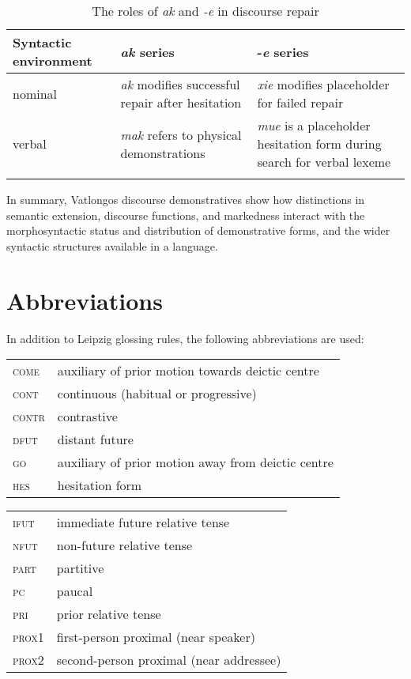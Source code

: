 \documentclass[output=paper,colorlinks,citecolor=brown]{langscibook}
\begin{document}
\begin{table}
\caption{The roles of \textit{ak} and \textit{-e} in discourse repair}
\label{tab:ridge:11}
\begin{tabularx}{\textwidth}{lQQ}
\lsptoprule
\textbf{Syntactic environment} & \textbf{\textit{ak} series} & \textbf{-\textit{e} series}\\
\midrule 
nominal & \textit{ak} modifies successful repair after hesitation & {\textit{xie} modifies placeholder for failed repair}\\
{verbal} & \textit{mak} refers to physical demonstrations & {\textit{mue} is a placeholder hesitation form during search for verbal lexeme}\\
\lspbottomrule
\end{tabularx}
\end{table}

In summary, Vatlongos discourse demonstratives show how distinctions in semantic extension, discourse functions, and markedness interact with the morphosyntactic status and distribution of demonstrative forms, and the wider syntactic structures available in a language.

\section*{Abbreviations}
In addition to Leipzig glossing rules, the following abbreviations are used: 

\noindent
\begin{tabularx}{.45\textwidth}{lQ}
\textsc{come} & auxiliary of prior motion towards deictic centre \\
\textsc{cont} & continuous (habitual or progressive)\\
\textsc{contr} & contrastive\\
\textsc{dfut} & distant future\\
\textsc{go} & auxiliary of prior motion away from deictic centre\\
\textsc{hes} & hesitation form\\
\end{tabularx}
\begin{tabularx}{.45\textwidth}{lQ}
\textsc{ifut} & immediate future relative tense\\
\textsc{nfut} & non-future relative tense\\
\textsc{part} & partitive\\
\textsc{pc} & paucal \\
\textsc{pri} & prior relative tense\\
\textsc{prox}1 & first-person proximal (near speaker)\\
\textsc{prox}2 & second-person proximal (near addressee)\\
\end{tabularx}

\sloppy\printbibliography[heading=subbibliography,notkeyword=this]
\end{document}
